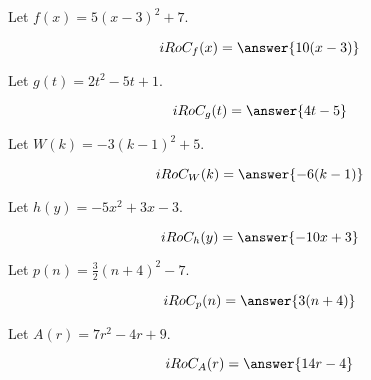 \documentclass{ximera}
\author{Lee Wayand}
\begin{document}
\begin{exercise} 






\begin{question}


Let $f(x) = 5 (x-3)^2 + 7$.


\[
iRoC_f(x) = \answer{10(x-3)}
\]

\end{question}





\begin{question}


Let $g(t) = 2t^2 - 5t + 1$.


\[
iRoC_g(t) = \answer{4t-5}
\]

\end{question}











\begin{question}


Let $W(k) = -3 (k-1)^2 + 5$.


\[
iRoC_W(k) = \answer{-6(k-1)}
\]

\end{question}





\begin{question}


Let $h(y) = -5x^2 + 3x - 3$.


\[
iRoC_h(y) = \answer{-10x + 3}
\]

\end{question}












\begin{question}


Let $p(n) = \frac{3}{2} (n+4)^2 - 7$.


\[
iRoC_p(n) = \answer{3(n+4)}
\]

\end{question}





\begin{question}


Let $A(r) = 7r^2 - 4r + 9$.


\[
iRoC_A(r) = \answer{14r-4}
\]

\end{question}










\end{exercise}
\end{document}
